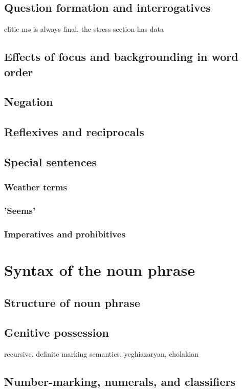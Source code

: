 \chapter{Question formation and interrogatives}

clitic mə is always final, the stress section has data
\chapter{Effects of focus and backgrounding in word order}
\chapter{Negation}
\chapter{Reflexives and reciprocals}
\chapter{Special sentences}
\section{Weather terms}
\section{'Seems' }
\section{Imperatives and prohibitives}








\part{Syntax of the noun phrase}
\chapter{Structure of noun phrase}
\chapter{Genitive possession}
recursive. definite marking semantics. yeghiazaryan, cholakian
\chapter{Number-marking, numerals, and classifiers}
